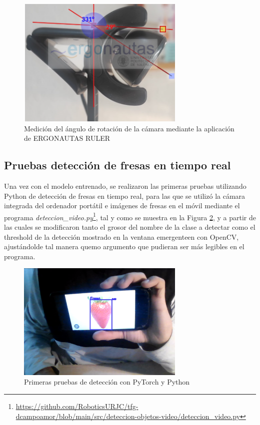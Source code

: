 \begin{figure}[H]
     \centering
     \begin{center}
       \includegraphics[width=80mm]{figs/ERGONAUTAS Medicion angulo.png}
     \end{center}
     \caption{Medición del ángulo de rotación de la cámara mediante la aplicación de ERGONAUTAS RULER}
    \label{fig:medicion_angulo_ERGONAUTAS}
  \end{figure}


\subsection{Pruebas detección de fresas en tiempo real}
\label{sec:Pruebas_Fresas_Pytorch}

Una vez con el modelo entrenado, se realizaron las primeras pruebas utilizando Python de detección de fresas en tiempo real, para las que se utilizó la cámara integrada del ordenador portátil e imágenes de fresas en el móvil mediante el programa \textit{deteccion\_video.py}\footnote{\url{https://github.com/RoboticsURJC/tfg-dcampoamor/blob/main/src/deteccion-objetos-video/deteccion_video.py}}, tal y como se muestra en la Figura \ref{fig:primerasdetecciones_Python}, y a partir de las cuales se modificaron tanto el grosor del nombre de la clase a detectar como el threshold de la detección mostrado en la ventana emergenteen con OpenCV, ajustándolde tal manera quemo argumento que pudieran ser más legibles en el programa.

  \begin{figure}[H]
     \centering
     \begin{center}
       \includegraphics[width=80mm]{figs/deteccion_video fresa en foto.png}
     \end{center}
     \caption{Primeras pruebas de detección con PyTorch y Python}
    \label{fig:primerasdetecciones_Python}
  \end{figure}

